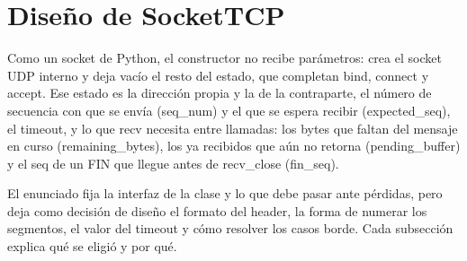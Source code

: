 \documentclass[
	spanish, %
	letterpaper, oneside
]{article}
\newcommand{\code}[1]{#1}     %
\newcommand{\flag}[1]{#1}     %
\newcommand{\field}[1]{#1}    %
\begin{document}
\templatePortrait

\templatePagecfg


\templateIndex

\templateFinalcfg


\section{Diseño de SocketTCP}
Como un socket de Python, el constructor no recibe
parámetros: crea el socket UDP interno y deja vacío el resto del estado, que completan
\code{bind}, \code{connect} y \code{accept}. Ese estado es la dirección propia y la de la
contraparte, el número de secuencia con que se envía (\field{seq\_num}) y el que se espera
recibir (\field{expected\_seq}), el timeout, y lo que \code{recv} necesita entre llamadas: los
bytes que faltan del mensaje en curso (\field{remaining\_bytes}), los ya recibidos que aún no
retorna (\field{pending\_buffer}) y el \field{seq} de un \flag{FIN} que llegue antes de
\code{recv\_close} (\field{fin\_seq}).

El enunciado fija la interfaz de la clase y lo que debe pasar ante pérdidas, pero deja como
decisión de diseño el formato del header, la forma de numerar los segmentos, el valor del timeout
y cómo resolver los casos borde. Cada subsección explica qué se eligió y por qué.
\end{document}
